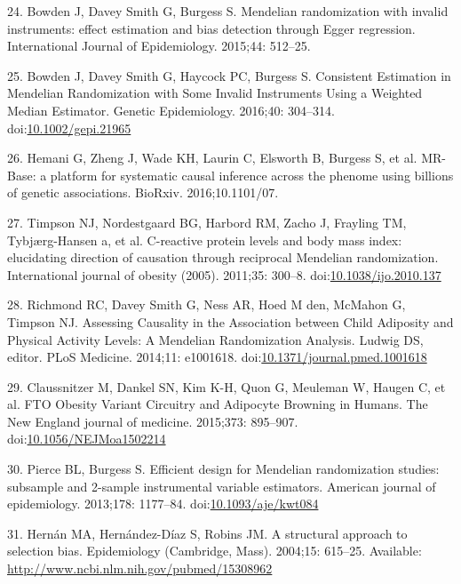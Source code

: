 \documentclass[]{article}
\begin{document}
\leavevmode\hypertarget{ref-Bowden2015}{}%
24. Bowden J, Davey Smith G, Burgess S. Mendelian randomization with
invalid instruments: effect estimation and bias detection through Egger
regression. International Journal of Epidemiology. 2015;44: 512--25.

\leavevmode\hypertarget{ref-Bowden2016b}{}%
25. Bowden J, Davey Smith G, Haycock PC, Burgess S. Consistent
Estimation in Mendelian Randomization with Some Invalid Instruments
Using a Weighted Median Estimator. Genetic Epidemiology. 2016;40:
304--314.
doi:\href{https://doi.org/10.1002/gepi.21965}{10.1002/gepi.21965}

\leavevmode\hypertarget{ref-Hemani2016}{}%
26. Hemani G, Zheng J, Wade KH, Laurin C, Elsworth B, Burgess S, et al.
MR-Base: a platform for systematic causal inference across the phenome
using billions of genetic associations. BioRxiv. 2016;10.1101/07.

\leavevmode\hypertarget{ref-Timpson2011}{}%
27. Timpson NJ, Nordestgaard BG, Harbord RM, Zacho J, Frayling TM,
Tybjærg-Hansen a, et al. C-reactive protein levels and body mass index:
elucidating direction of causation through reciprocal Mendelian
randomization. International journal of obesity (2005). 2011;35: 300--8.
doi:\href{https://doi.org/10.1038/ijo.2010.137}{10.1038/ijo.2010.137}

\leavevmode\hypertarget{ref-Richmond2014}{}%
28. Richmond RC, Davey Smith G, Ness AR, Hoed M den, McMahon G, Timpson
NJ. Assessing Causality in the Association between Child Adiposity and
Physical Activity Levels: A Mendelian Randomization Analysis. Ludwig DS,
editor. PLoS Medicine. 2014;11: e1001618.
doi:\href{https://doi.org/10.1371/journal.pmed.1001618}{10.1371/journal.pmed.1001618}

\leavevmode\hypertarget{ref-Claussnitzer2015}{}%
29. Claussnitzer M, Dankel SN, Kim K-H, Quon G, Meuleman W, Haugen C, et
al. FTO Obesity Variant Circuitry and Adipocyte Browning in Humans. The
New England journal of medicine. 2015;373: 895--907.
doi:\href{https://doi.org/10.1056/NEJMoa1502214}{10.1056/NEJMoa1502214}

\leavevmode\hypertarget{ref-Pierce2013}{}%
30. Pierce BL, Burgess S. Efficient design for Mendelian randomization
studies: subsample and 2-sample instrumental variable estimators.
American journal of epidemiology. 2013;178: 1177--84.
doi:\href{https://doi.org/10.1093/aje/kwt084}{10.1093/aje/kwt084}

\leavevmode\hypertarget{ref-Hernan2004}{}%
31. Hernán MA, Hernández-Díaz S, Robins JM. A structural approach to
selection bias. Epidemiology (Cambridge, Mass). 2004;15: 615--25.
Available: \url{http://www.ncbi.nlm.nih.gov/pubmed/15308962}
\end{document}

